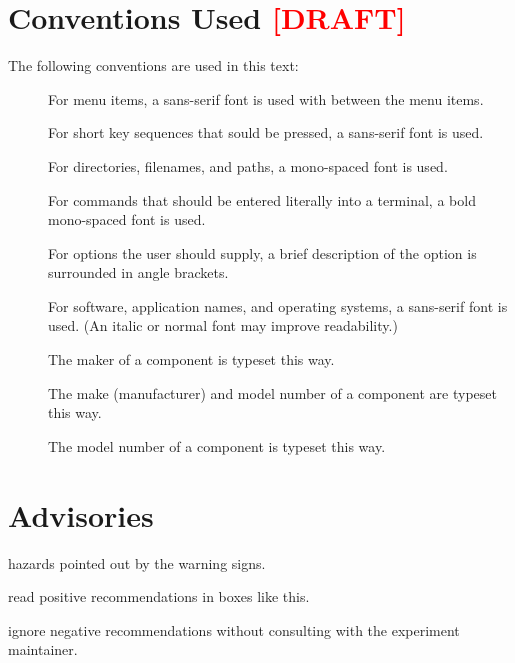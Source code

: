 \section{Conventions Used \textcolor{red}{[DRAFT]}}
\label{sec:intro:conventions}

The following conventions are used in this text:

\begin{description}

  \item[] For menu items, a sans-serif font is
    used with \menusep between the menu items.
  \item[] For short key sequences that sould be pressed, a sans-serif font is used.
  \item[] For directories, filenames, and paths, a mono-spaced font is used.
  \item[] For commands that should be
    entered literally into a terminal, a bold mono-spaced font is used.
  \item[] For options the user should supply,
    a brief description of the option is surrounded in angle brackets.
  \item[] For software, application names, and operating systems, a sans-serif font is used. (\FIXME An italic or normal font may improve readability.)
  \item[] The maker of a component is typeset this way.
  \item[] The make (manufacturer) and model number of a component are typeset this way.
  \item[] The model number of a component is typeset this way.

\end{description}

\section{Advisories}
\label{sec:intro:advisories}

\begin{avoid} hazards pointed out by the warning signs. \end{avoid}
\begin{pleasedo} read positive recommendations in boxes like this. \end{pleasedo}
\begin{pleasedonot} ignore negative recommendations without consulting with the experiment maintainer. \end{pleasedonot}

